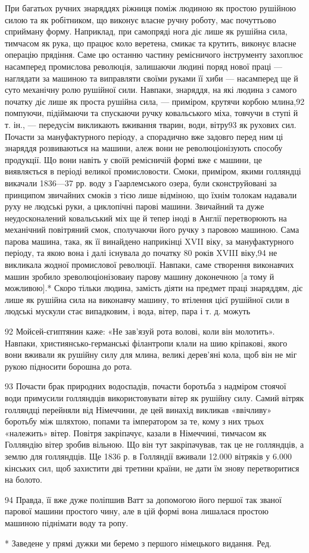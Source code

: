 При багатьох ручних знаряддях ріжниця поміж людиною як
простою рушійною силою та як робітником, що виконує власне
ручну роботу, має почуттьово сприйману форму. Наприклад,
при самопряді нога діє лише як рушійна сила, тимчасом як рука,
що працює коло веретена, смикає та крутить, виконує власне
операцію прядіння. Саме цю останню частину ремісничого інструменту
захоплює насамперед промислова революція, залишаючи
людині поряд нової праці — наглядати за машиною та виправляти
своїми руками її хиби — насамперед ще й суто механічну ролю
рушійної сили. Навпаки, знаряддя, на які людина з самого початку
діє лише як проста рушійна сила, — приміром, крутячи корбою
млина,92 помпуючи, підіймаючи та спускаючи ручку ковальського
міха, товчучи в ступі й т. ін., — передусім викликають вживання
тварин, води, вітру93 як рухових сил. Почасти за мануфактурного
періоду, а спорадично вже задовго перед ним ці знаряддя
розвиваються на машини, алеж вони не революціонізують способу
продукції. Що вони навіть у своїй ремісничій формі вже є
машини, це виявляється в періоді великої промисловости. Смоки,
приміром, якими голляндці викачали 1836—37 рр. воду з Гаарлемського
озера, були сконструйовані за принципом звичайних
смоків з тією лише відміною, що їхнім толокам надавали руху не
людські руки, а циклопічні парові машини. Звичайний та дуже
неудосконалений ковальський міх ще й тепер іноді в Англії перетворюють
на механічний повітряний смок, сполучаючи його
ручку з паровою машиною. Сама парова машина, така, як її
винайдено наприкінці XVII віку, за мануфактурного періоду,
та якою вона і далі існувала до початку 80 років XVIII віку,94
не викликала жодної промислової революції. Навпаки, саме створення
виконавчих машин зробило зреволюціонізоваиу парову
машину доконечною [а тому й можливою].* Скоро тільки людина,
замість діяти на предмет праці знаряддям, діє лише як рушійна
сила на виконавчу машину, то втілення цієї рушійної сили в
людські мускули стає випадковим, і вода, вітер, пара і т. д. можуть

92    Мойсей-єгиптянин каже: «Не зав’язуй рота волові, коли він молотить».
Навпаки, християнсько-германські філантропи клали на шию
кріпакові, якого вони вживали як рушійну силу для млина, великі дерев’яні
кола, щоб він не міг рукою підносити борошна до рота.

93    Почасти брак природних водоспадів, почасти боротьба з надміром
стоячої води примусили голляндців використовувати вітер як рушійну
силу. Самий вітряк голляндці перейняли від Німеччини, де цей винахід
викликав «ввічливу» боротьбу між шляхтою, попами та імператором за те,
кому з них трьох «належить» вітер. Повітря закріпачує, казали в Німеччині,
тимчасом як Голляндію вітер зробив вільною. Що він тут закріпачував,
так це не голляндців, а землю для голляндців. Ще 1836 р.
в Голляндії вживали 12.000 вітряків у 6.000 кінських сил, щоб захистити
дві третини країни, не дати їм знову перетворитися на болото.

94    Правда, її вже дуже поліпшив Ватт за допомогою його першої
так званої парової машини простого чину, але в цій формі вона лишалася
простою машиною піднімати воду та ропу.

* Заведене у прямі дужки ми беремо з першого німецького видання.
Ред.
